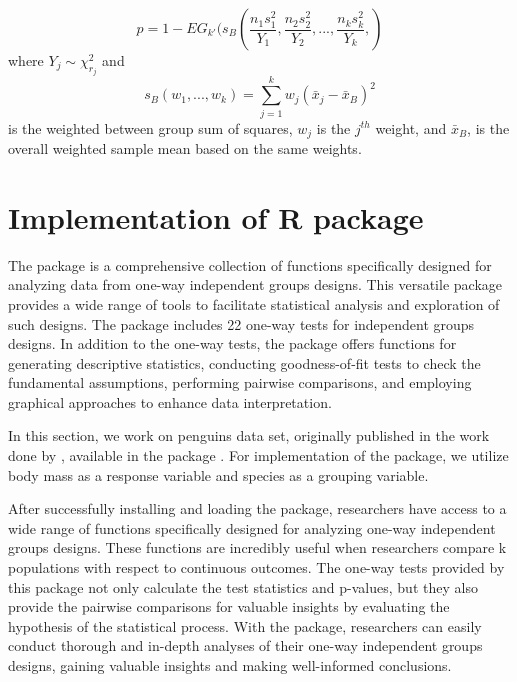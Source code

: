 \begin{equation}
    p = 1 - EG_{k'} (s_B \left(\frac{n_1 s_1^2}{Y_1},
\frac{n_2 s_2^2}{Y_2}, ..., \frac{n_k s_k^2}{Y_k} , 
    \right)
\end{equation}
where $Y_j \sim \chi_{r_j}^2$ and 
$$
s_B (w_1,...,w_k) = \sum_{j=1}^{k} w_j \left( \bar{x}_j  -\bar{x}_B\right)^2 
$$ 
is the weighted between group sum of squares, $w_j$ is the $j^{th}$ weight, and $\bar{x}_B$, is the overall weighted sample mean based on the same weights. 


\section{Implementation of R package}\label{Rpackage}

The  package is a comprehensive collection of functions specifically designed for analyzing data from one-way independent groups designs. This versatile package provides a wide range of tools to facilitate statistical analysis and exploration of such designs. The package includes 22 one-way tests for independent groups designs. In addition to the one-way tests, the package offers functions for generating descriptive statistics, conducting goodness-of-fit tests to check the fundamental assumptions, performing pairwise comparisons, and employing graphical approaches to enhance data interpretation. 

In this section, we work on penguins data set, originally published in the work done by \cite{gorman2014ecological}, available in the  package \citep{Horst2020palmerpenguins}. For implementation of the package, we utilize body mass as a response variable and species as a grouping variable.

After successfully installing and loading the  package, researchers have access to a wide range of functions specifically designed for analyzing one-way independent groups designs. These functions are incredibly useful when researchers compare k populations with respect to continuous outcomes. The one-way tests provided by this package not only calculate the test statistics and p-values, but they also provide the pairwise comparisons for valuable insights by evaluating the hypothesis of the statistical process. With the  package, researchers can easily conduct thorough and in-depth analyses of their one-way independent groups designs, gaining valuable insights and making well-informed conclusions.

